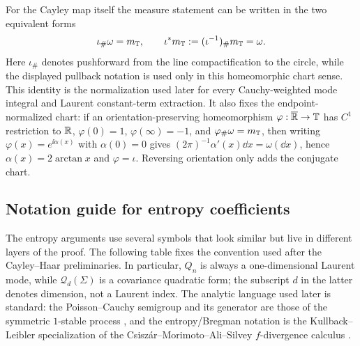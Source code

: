 \begin{remark}\label{rem:haar-pullback-normalization}
For the Cayley map itself the measure statement can be written in the two
equivalent forms
\begin{equation}\label{eq:haar-pullback}
\iota_{\#}\omega=m_{\mathbb{T}},
\qquad
\iota^{*}m_{\mathbb{T}}:=(\iota^{-1})_{\#}m_{\mathbb{T}}=\omega.
\end{equation}
Here \(\iota_{\#}\) denotes pushforward from the line compactification to
the circle, while the displayed pullback notation is used only in this
homeomorphic chart sense.
This identity is the normalization used later for every Cauchy-weighted
mode integral and Laurent constant-term extraction.  It also fixes the
endpoint-normalized chart: if an orientation-preserving homeomorphism
\(\varphi:\overline{\mathbb{R}}\to\mathbb{T}\) has \(C^1\) restriction to \(\mathbb{R}\),
\(\varphi(0)=1\), \(\varphi(\infty)=-1\), and
\(\varphi_{\#}\omega=m_{\mathbb{T}}\), then writing
\(\varphi(x)=e^{\ii\alpha(x)}\) with \(\alpha(0)=0\) gives
\((2\pi)^{-1}\alpha'(x)\dd x=\omega(\dd x)\), hence
\(\alpha(x)=2\arctan x\) and \(\varphi=\iota\).  Reversing orientation only
adds the conjugate chart.
\end{remark}

\subsection*{Notation guide for entropy coefficients}
\label{subsec:notation-guide-entropy}

The entropy arguments use several symbols that look similar but live in
different layers of the proof.  The following table fixes the convention used
after the Cayley--Haar preliminaries.  In particular, \(Q_n\) is always a
one-dimensional Laurent mode, while \(\mathcal Q_d(\Sigma)\) is a covariance
quadratic form; the subscript \(d\) in the latter denotes dimension, not a
Laurent index.
The analytic language used later is standard: the Poisson--Cauchy semigroup
and its generator are those of the symmetric \(1\)-stable process
\cite{Feller1971,Bertoin1996LevyProcesses,Sato1999LevyProcesses,
Applebaum2009LevyProcesses,Kwasnicki2017}, and the entropy/Bregman notation is
the Kullback--Leibler specialization of the Csisz{\'a}r--Morimoto--Ali--Silvey
\(f\)-divergence calculus
\cite{KullbackLeibler1951,AliSilvey1966Divergence,Csiszar1967,
Morimoto1963Markov,Vajda1989TheoryDivergence,CoverThomas2006,Bregman1967}.

